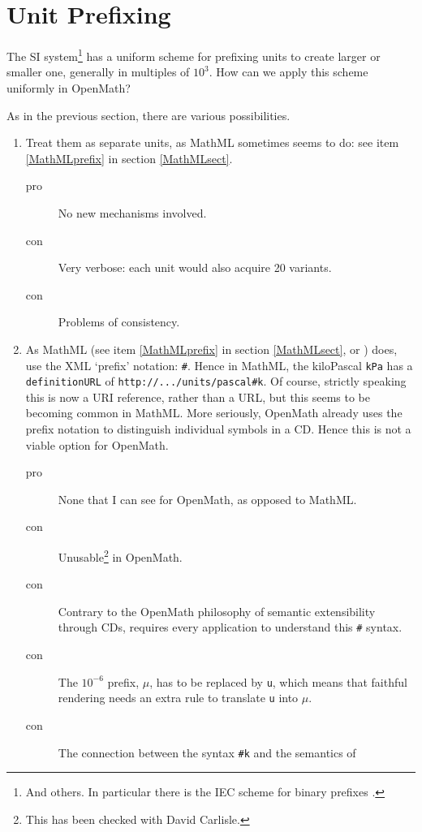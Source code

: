 \documentclass[11pt]{openmathTN}
\begin{document}
\section{Unit Prefixing}\label{prefixing}
The SI system\footnote{And others. In particular there is the IEC scheme
for binary prefixes \cite[Appendix B.2]{WorldWideWebConsortium2003}.} has a
uniform scheme for prefixing units to create larger or smaller one,
generally in multiples of $10^3$. How can we apply this scheme uniformly in
OpenMath?
\par
As in the previous section, there are various possibilities.
\begin{enumerate}
\item Treat them as separate units, as MathML sometimes seems to do: see
item \ref{MathMLprefix} in section \ref{MathMLsect}.
\begin{description}
\item[pro]No new mechanisms involved.
\item[con]Very verbose: each unit would also acquire 20 variants.
\item[con]Problems of consistency.
\end{description}
\item As MathML (see item \ref{MathMLprefix} in section \ref{MathMLsect},
or \cite[section 5.3.5]{WorldWideWebConsortium2003}) does, use the XML
`prefix' notation: \verb+#+. Hence in MathML, the kiloPascal {\tt kPa} has
a {\tt definitionURL} of \verb+http://.../units/pascal#k+. Of course,
strictly speaking this is now a URI reference, rather than a URL, but this
seems to be becoming common in MathML. More seriously, OpenMath already
uses the prefix notation to distinguish individual symbols in a CD. Hence
this is not a viable option for OpenMath.
\begin{description}
\item[pro]None that I can see for OpenMath, as opposed to MathML.
\item[con]Unusable\footnote{This has been checked with David Carlisle.} in
OpenMath.
\item[con]Contrary to the OpenMath philosophy \cite{OMSTD} of semantic
extensibility through CDs, requires every application to understand this
\verb+#+ syntax.
\item[con]The $10^{-6}$ prefix, $\mu$, has to be replaced by \verb+u+,
which means that faithful rendering needs an extra rule to translate
\verb+u+ into $\mu$.
\item[con]The connection between the syntax \verb+#k+ and the semantics of

\end{description}
\end{enumerate}
\end{document}
